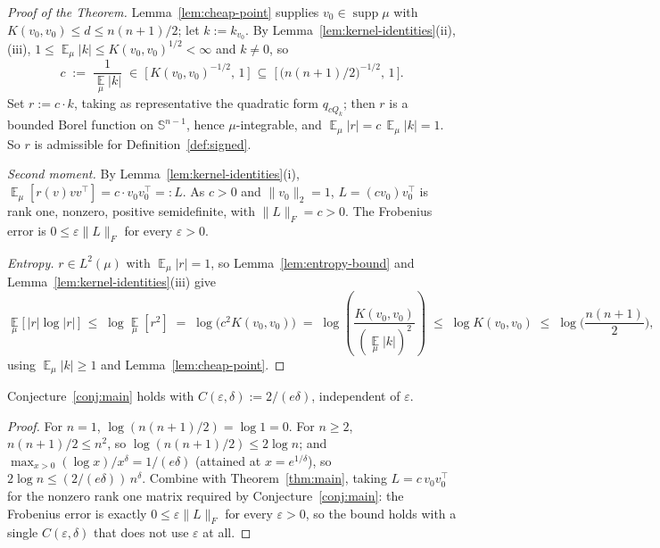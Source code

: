 \documentclass{aicr-solution}
\newcommand{\Expect}{\operatorname*{\mathbb{E}}}
\newcommand{\Sph}{\mathbb{S}^{n-1}}
\newcommand{\supp}{\operatorname{supp}}
\begin{document}
\begin{proof}[Proof of the Theorem]
Lemma~\ref{lem:cheap-point} supplies $v_{0} \in \supp\mu$ with
$K(v_{0},v_{0}) \le d \le n(n+1)/2$; let $k := k_{v_{0}}$. By
Lemma~\ref{lem:kernel-identities}(ii),(iii), $1 \le \Expect_{\mu}|k|
\le K(v_{0},v_{0})^{1/2} < \infty$ and $k \ne 0$, so
\[
  c \;:=\; \frac{1}{\Expect_{\mu}|k|} \;\in\;
  \Big[\, K(v_{0},v_{0})^{-1/2},\, 1 \,\Big] \;\subseteq\;
  \Big[\, \big(n(n+1)/2\big)^{-1/2},\, 1 \,\Big].
\]
Set $r := c\cdot k$, taking as representative the quadratic form
$q_{cQ_{k}}$; then $r$ is a bounded Borel function on $\Sph$, hence
$\mu$-integrable, and $\Expect_{\mu}|r| = c\,\Expect_{\mu}|k| = 1$. So
$r$ is admissible for Definition~\ref{def:signed}.

\emph{Second moment.} By Lemma~\ref{lem:kernel-identities}(i),
$\Expect_{\mu}[r(v)vv^{\top}] = c\cdot v_{0}v_{0}^{\top} =: L$. As
$c>0$ and $\|v_{0}\|_{2} = 1$, $L = (cv_{0})v_{0}^{\top}$ is rank one,
nonzero, positive semidefinite, with $\|L\|_{F} = c > 0$. The
Frobenius error is $0 \le \varepsilon\|L\|_{F}$ for every
$\varepsilon > 0$.

\emph{Entropy.} $r \in L^{2}(\mu)$ with $\Expect_{\mu}|r| = 1$, so
Lemma~\ref{lem:entropy-bound} and Lemma~\ref{lem:kernel-identities}(iii)
give
\[
  \Expect_{\mu}\big[\,|r|\log|r|\,\big] \;\le\; \log
  \Expect_{\mu}[r^{2}] \;=\; \log\!\Big(c^{2}K(v_{0},v_{0})\Big) \;=\;
  \log\!\left(\frac{K(v_{0},v_{0})}{(\Expect_{\mu}|k|)^{2}}\right) \;\le\;
  \log K(v_{0},v_{0}) \;\le\; \log\Big(\frac{n(n+1)}{2}\Big),
\]
using $\Expect_{\mu}|k| \ge 1$ and Lemma~\ref{lem:cheap-point}.
\end{proof}

\begin{corollary}\label{cor:main}
Conjecture~\ref{conj:main} holds with $C(\varepsilon,\delta) :=
2/(e\delta)$, independent of $\varepsilon$.
\end{corollary}

\begin{proof}
For $n=1$, $\log(n(n+1)/2) = \log 1 = 0$. For $n \ge 2$, $n(n+1)/2 \le
n^{2}$, so $\log(n(n+1)/2) \le 2\log n$; and $\max_{x>0}(\log x)/x^{\delta}
= 1/(e\delta)$ (attained at $x = e^{1/\delta}$), so $2\log n \le
(2/(e\delta))\,n^{\delta}$. Combine with Theorem~\ref{thm:main}, taking
$L = c\,v_{0}v_{0}^{\top}$ for the nonzero rank one matrix required by
Conjecture~\ref{conj:main}: the Frobenius error is exactly $0 \le
\varepsilon\|L\|_{F}$ for every $\varepsilon > 0$, so the bound holds
with a single $C(\varepsilon,\delta)$ that does not use $\varepsilon$
at all.
\end{proof}
\end{document}
